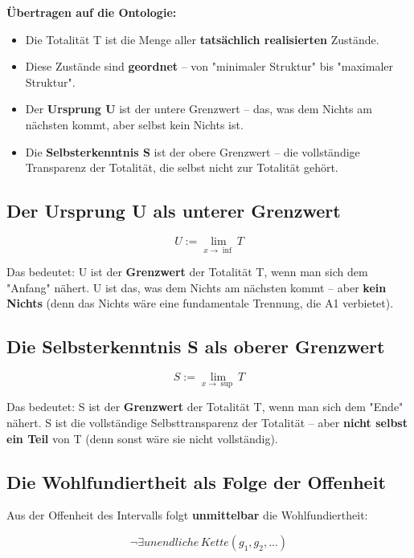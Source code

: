 \documentclass[
]{article}
\begin{document}
\textbf{Übertragen auf die Ontologie:}
\begin{itemize}
\item Die Totalität T ist die Menge aller \textbf{tatsächlich realisierten} Zustände.
\item Diese Zustände sind \textbf{geordnet} – von "minimaler Struktur" bis "maximaler Struktur".
\item Der \textbf{Ursprung U} ist der untere Grenzwert – das, was dem Nichts am nächsten kommt, aber selbst kein Nichts ist.
\item Die \textbf{Selbsterkenntnis S} ist der obere Grenzwert – die vollständige Transparenz der Totalität, die selbst nicht zur Totalität gehört.
\end{itemize}

\subsection{Der Ursprung U als unterer Grenzwert}\label{der-ursprung-u-als-unterer-grenzwert}

\[
\boxed{U := \lim_{x \to \inf} T}
\]

Das bedeutet: U ist der \textbf{Grenzwert} der Totalität T, wenn man sich dem "Anfang" nähert. U ist das, was dem Nichts am nächsten kommt – aber \textbf{kein Nichts} (denn das Nichts wäre eine fundamentale Trennung, die A1 verbietet).

\subsection{Die Selbsterkenntnis S als oberer Grenzwert}\label{die-selbsterkenntnis-s-als-oberer-grenzwert}

\[
\boxed{S := \lim_{x \to \sup} T}
\]

Das bedeutet: S ist der \textbf{Grenzwert} der Totalität T, wenn man sich dem "Ende" nähert. S ist die vollständige Selbsttransparenz der Totalität – aber \textbf{nicht selbst ein Teil} von T (denn sonst wäre sie nicht vollständig).

\subsection{Die Wohlfundiertheit als Folge der Offenheit}\label{die-wohlfundiertheit-als-folge-der-offenheit}

Aus der Offenheit des Intervalls folgt \textbf{unmittelbar} die Wohlfundiertheit:

\[
\boxed{\neg\exists unendliche\, Kette(g_1, g_2, ...)}
\]
\end{document}
